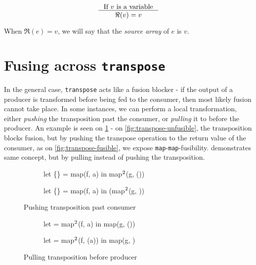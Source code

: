 \[
\inference{
  \mbox{If $v$ is a variable}
}{
  \Re(v) = v
}
\]

When $\Re(e) = v$, we will say that the \textit{source array} of $e$
is $v$.

\section{Fusing across \texttt{transpose}}

In the general case, \texttt{transpose} acts like a fusion blocker -
if the output of a producer is transformed before being fed to the
consumer, then most likely fusion cannot take place.  In some
instances, we can perform a local transformation, either
\textit{pushing} the transposition past the consumer, or
\textit{pulling} it to before the producer.  An example is seen on
\cref{fig:fuse-across-transpose} - on \cref{fig:transpose-unfusible},
the transposition blocks fusion, but by pushing the transpose
operation to the return value of the consumer, as on
\cref{fig:transpose-fusible}, we expose
\texttt{map}-\texttt{map}-fusibility.  
demonstrates same concept, but by pulling instead of pushing the
transposition.

\begin{figure}
\begin{subfigure}[t]{.5\textwidth}
\begin{colorcode}
let \{\} = map(f, a) in
map\(^{2}\)(g, ())
\end{colorcode}
\end{subfigure}%
\begin{subfigure}[t]{.5\textwidth}
\begin{colorcode}
let \{\} = map(f, a) in
(map\(^{2}\)(g, ))
\end{colorcode}
\end{subfigure}

\caption{Pushing transposition past consumer}
\label{fig:fuse-across-transpose}
\end{figure}

\begin{figure}
\begin{subfigure}[t]{.5\textwidth}
\begin{colorcode}
let  = map\(^{2}\)(f, a) in
map(g, ())
\end{colorcode}
\end{subfigure}%
\begin{subfigure}[t]{.5\textwidth}
\begin{colorcode}
let  = map\(^{2}\)(f, (a)) in
map(g, )
\end{colorcode}
\end{subfigure}

\caption{Pulling transposition before producer}
\label{fig:pull-transpose}
\end{figure}

